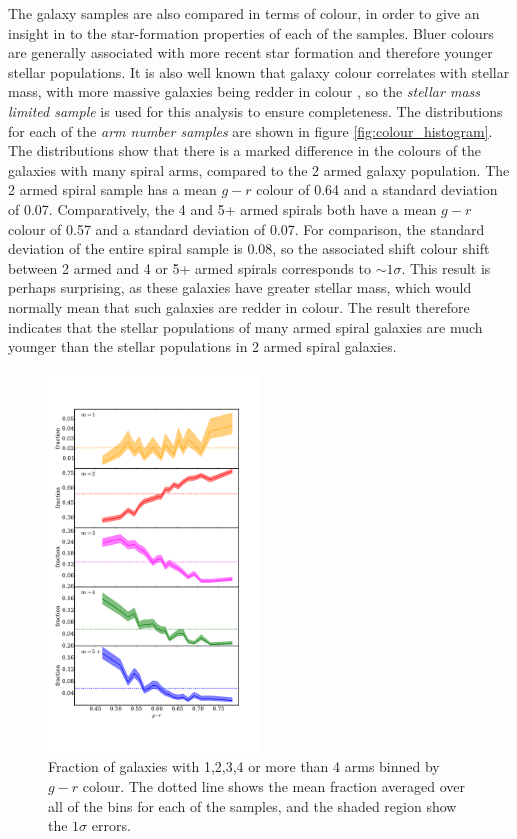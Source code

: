 \documentclass[useAMS,usenatbib]{mn2e}
\begin{document}
The galaxy samples are also compared in terms of colour, in order to give an insight in to the star-formation properties of each of the samples. Bluer colours are generally associated with more recent star formation and therefore younger stellar populations. It is also well known that galaxy colour correlates with stellar mass, with more massive galaxies being redder in colour \citep{Baldry_06}, so the \textit{stellar mass limited sample} is used for this analysis to ensure completeness. The distributions for each of the \textit{arm number samples} are shown in figure \ref{fig:colour_histogram}. The distributions show that there is a marked difference in the colours of the galaxies with many spiral arms, compared to the 2 armed galaxy population. The 2 armed spiral sample has a mean $g-r$ colour of 0.64 and a standard deviation of 0.07. Comparatively, the 4 and 5+ armed spirals both have a mean $g-r$ colour of 0.57 and a standard deviation of 0.07. For comparison, the standard deviation of the entire spiral sample is 0.08, so the associated shift colour shift between 2 armed and 4 or 5+ armed spirals corresponds to $\sim 1 \sigma$. This result is perhaps surprising, as these galaxies have greater stellar mass, which would normally mean that such galaxies are redder in colour. The result therefore indicates that the stellar populations of many armed spiral galaxies are much younger than the stellar populations in 2 armed spiral galaxies. 

\begin{figure}
		\centering
		
        \includegraphics[width=0.5\textwidth]{Results_imgs/colour_plot.pdf}
		
        \caption{Fraction of galaxies with 1,2,3,4 or more than 4 arms binned by $g-r$ colour. The dotted line shows the mean fraction averaged over all of the bins for each of the samples, and the shaded region show the $1 \sigma$ errors.}
		
        \label{fig:colour_plot}
        
\end{figure}
\end{document}
